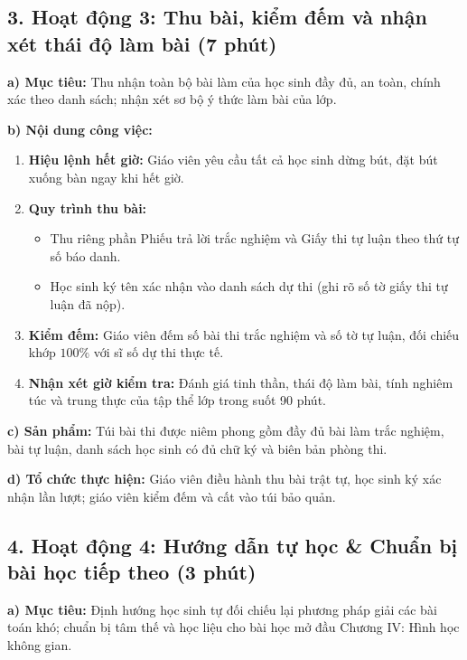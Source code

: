 \documentclass[12pt, a4paper]{article}
\begin{document}
\subsection*{3. Hoạt động 3: Thu bài, kiểm đếm và nhận xét thái độ làm bài (7 phút)}

\noindent \textbf{a) Mục tiêu:}
Thu nhận toàn bộ bài làm của học sinh đầy đủ, an toàn, chính xác theo danh sách; nhận xét sơ bộ ý thức làm bài của lớp.

\noindent \textbf{b) Nội dung công việc:}
\begin{enumerate}[leftmargin=0.6cm]
    \item \textbf{Hiệu lệnh hết giờ:} Giáo viên yêu cầu tất cả học sinh dừng bút, đặt bút xuống bàn ngay khi hết giờ.
    \item \textbf{Quy trình thu bài:}
    \begin{itemize}
        \item Thu riêng phần Phiếu trả lời trắc nghiệm và Giấy thi tự luận theo thứ tự số báo danh.
        \item Học sinh ký tên xác nhận vào danh sách dự thi (ghi rõ số tờ giấy thi tự luận đã nộp).
    \end{itemize}
    \item \textbf{Kiểm đếm:} Giáo viên đếm số bài thi trắc nghiệm và số tờ tự luận, đối chiếu khớp $100\%$ với sĩ số dự thi thực tế.
    \item \textbf{Nhận xét giờ kiểm tra:} Đánh giá tinh thần, thái độ làm bài, tính nghiêm túc và trung thực của tập thể lớp trong suốt 90 phút.
\end{enumerate}

\noindent \textbf{c) Sản phẩm:}
Túi bài thi được niêm phong gồm đầy đủ bài làm trắc nghiệm, bài tự luận, danh sách học sinh có đủ chữ ký và biên bản phòng thi.

\noindent \textbf{d) Tổ chức thực hiện:}
Giáo viên điều hành thu bài trật tự, học sinh ký xác nhận lần lượt; giáo viên kiểm đếm và cất vào túi bảo quản.

\subsection*{4. Hoạt động 4: Hướng dẫn tự học \& Chuẩn bị bài học tiếp theo (3 phút)}

\noindent \textbf{a) Mục tiêu:}
Định hướng học sinh tự đối chiếu lại phương pháp giải các bài toán khó; chuẩn bị tâm thế và học liệu cho bài học mở đầu Chương IV: Hình học không gian.
\end{document}

